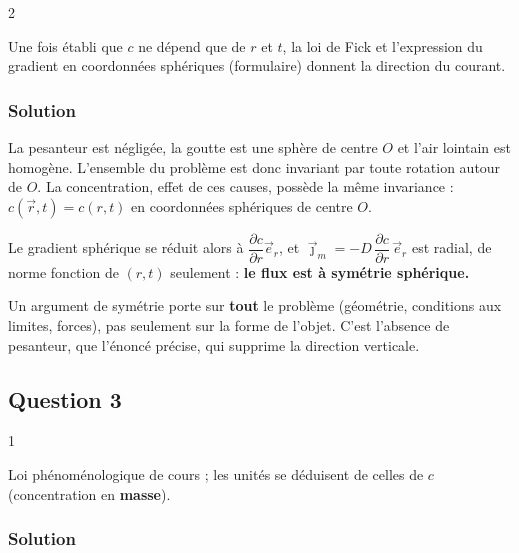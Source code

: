 \documentclass[11pt,a4paper]{article}
\begin{document}
\begin{indication}{2}

Une fois établi que \(c\) ne dépend que de \(r\) et \(t\), la loi de Fick et l'expression du gradient en coordonnées sphériques (formulaire) donnent la direction du courant.

\end{indication}

\hypertarget{solution-1}{%
\subsubsection{Solution}\label{solution-1}}

La pesanteur est négligée, la goutte est une sphère de centre \(O\) et l'air lointain est homogène. L'ensemble du problème est donc invariant par toute rotation autour de \(O\). La concentration, effet de ces causes, possède la même invariance : \(c(\vec r,t)=c(r,t)\) en coordonnées sphériques de centre \(O\).

Le gradient sphérique se réduit alors à \(\dfrac{\partial c}{\partial r}\vec e_r\), et \(\vec\jmath_m=-D\,\dfrac{\partial c}{\partial r}\,\vec e_r\) est radial, de norme fonction de \((r,t)\) seulement : \textbf{le flux est à symétrie sphérique.}

\begin{methode}

Un argument de symétrie porte sur \textbf{tout} le problème (géométrie, conditions aux limites, forces), pas seulement sur la forme de l'objet. C'est l'absence de pesanteur, que l'énoncé précise, qui supprime la direction verticale.

\end{methode}

\hypertarget{question-3}{%
\subsection{Question 3}\label{question-3}}

\begin{indication}{1}

Loi phénoménologique de cours ; les unités se déduisent de celles de \(c\) (concentration en \textbf{masse}).

\end{indication}

\hypertarget{solution-2}{%
\subsubsection{Solution}\label{solution-2}}
\end{document}
